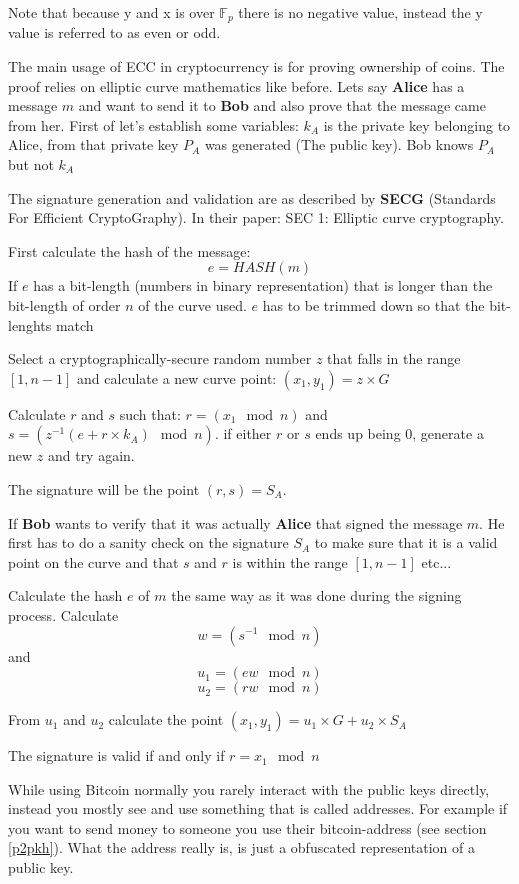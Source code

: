Note that because y and x is over $\mathbb{F}_{p}$ there is no negative value, instead the y 
value is referred to as even or odd. 

The main usage of ECC in cryptocurrency is for proving ownership of coins.\cite{antonopoulos_2017}\cite{nakamoto_bitcoin} The proof relies 
on elliptic curve mathematics like before. Lets say \textbf{Alice} has a message $m$ and want 
to send it to \textbf{Bob} and also prove that the message came from her. First of let's 
establish some variables: $k_A$ is the private key belonging to Alice, from that private 
key $P_A$ was generated (The public key). Bob knows $P_A$ but not $k_A$ 

The signature generation and validation are as described by \textbf{SECG} (Standards For Efficient CryptoGraphy). In their paper: SEC 1: Elliptic curve cryptography.\cite{ecc_def}

First calculate the hash of the message:
$$e=HASH(m)$$
If $e$ has a bit-length (numbers in binary representation) that is longer than the bit-length 
of order $n$ of the curve used. $e$ has to be trimmed down so that the bit-lenghts match

Select a cryptographically-secure random number $z$ that falls in the range $[1, n-1]$ and 
calculate a new curve point: $(x_1, y_1) = z \times G$

Calculate $r$ and $s$ such that: $r = (x_1 \mod n)$ and $s = (z^{-1} (e + r \times k_A) \mod n)$. 
if either $r$ or $s$ ends up being 0, generate a new $z$ and try again.

The signature will be the point $(r, s) = S_A$.

\label{signature_validation}
If \textbf{Bob} wants to verify that it was actually \textbf{Alice} that signed the message $m$. 
He first has to do a sanity check on the signature $S_A$ to make sure that it is a valid point on 
the curve and that $s$ and $r$ is within the range $[1, n-1]$ etc... 

Calculate the hash $e$ of $m$ the same way as it was done during the signing process. Calculate 
$$w=(s^{-1} \mod n)$$ and $$u_1 = (ew \mod n)$$ $$u_2 = (rw \mod n)$$

From $u_1$ and $u_2$ calculate the point $(x_1, y_1) = u_1 \times G + u_2 \times S_A$ 

The signature is valid if and only if $r = x_1 \mod n$

While using Bitcoin normally you rarely interact with the public keys directly, instead you mostly see  and use something that is called addresses.\cite{antonopoulos_2017} For example if you want to send money to someone you use their bitcoin-address (see section \ref{p2pkh}). What the address really is, is just a obfuscated representation of a public key.  

